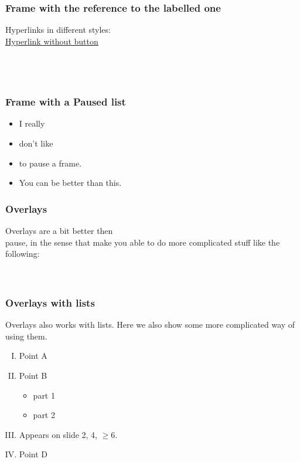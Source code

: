 \documentclass{beamer} %
\begin{document}
\begin{frame}
    \frametitle{Frame with the reference to the labelled one}
    Hyperlinks in different styles:\\
    \hyperlink{FrameToGo}{Hyperlink without button}\\
    \hyperlink{FrameToGo}{}\\
    \hyperlink{FrameToGo}{}\\
    \hyperlink{FrameToGo}{}\\
    \hyperlink{FrameToGo}{}
\end{frame}

\begin{frame}
    \frametitle{Frame with a Paused list}
    \begin{itemize}
        \pause
        \item I really
        \pause
        \item don't like
        \pause
        \item to pause a frame.
        \pause
        \item You can be better than this.
    \end{itemize}
\end{frame}

\begin{frame}
    \frametitle{Overlays}
    Overlays are a bit better then \\pause, in the sense that make you able to do more complicated stuff like the following:\\
    \\
    \\
\end{frame}

\begin{frame}
    \frametitle{Overlays with lists}
    Overlays also works with lists.
    Here we also show some more complicated way of using them.
    \begin{enumerate}[(I)]
        \item<1-> Point A
        \item<2-> Point B
        \begin{itemize}
            \item<3-> part 1
            \item<4-> part 2
        \end{itemize}
        \item<2,4,6-> Appears on slide 2, 4, $\geq$6.
        \item<5-> Point D
    \end{enumerate}
\end{frame}
\end{document}

